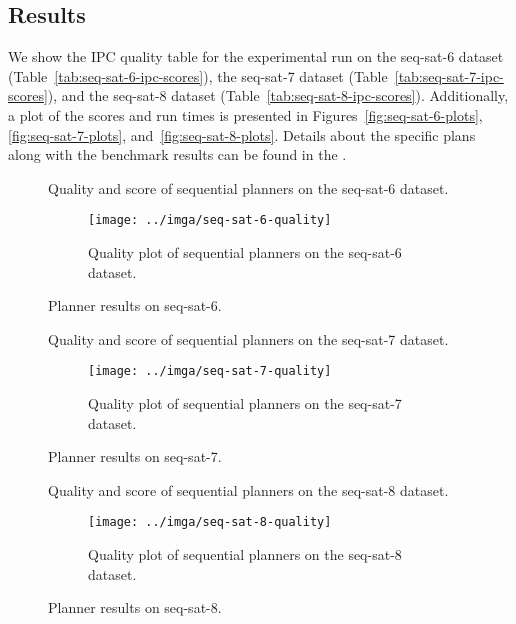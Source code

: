 \subsection{Results}\label{sequential-results}

We show the IPC quality table
for the experimental run on the seq-sat-6 dataset (Table~\ref{tab:seq-sat-6-ipc-scores}),
the seq-sat-7 dataset (Table~\ref{tab:seq-sat-7-ipc-scores}),
and the seq-sat-8 dataset (Table~\ref{tab:seq-sat-8-ipc-scores}).
Additionally, a plot of the scores and run times is presented in Figures~\ref{fig:seq-sat-6-plots},
\ref{fig:seq-sat-7-plots}, and~\ref{fig:seq-sat-8-plots}. Details about the specific plans along with the benchmark results can be found in the .

\begin{figure}
\centering
\begin{subtable}{\textwidth}
\centering

\caption{Quality and score of sequential planners on the seq-sat-6 dataset.}
\label{tab:seq-sat-6-ipc-scores}
\end{subtable}
\quad
\begin{subfigure}{\textwidth}
\centering
\texttt{[image: ../imga/seq-sat-6-quality]}
\caption{Quality plot of sequential planners on the seq-sat-6 dataset.}
\label{fig:seq-sat-6-quality}
\end{subfigure}
\caption{Planner results on seq-sat-6.}
\label{fig:seq-sat-6-results}
\end{figure}

\begin{figure}
\centering
\begin{subtable}{\textwidth}
\centering

\caption{Quality and score of sequential planners on the seq-sat-7 dataset.}
\label{tab:seq-sat-7-ipc-scores}
\end{subtable}
\quad
\begin{subfigure}{\textwidth}
\centering
\texttt{[image: ../imga/seq-sat-7-quality]}
\caption{Quality plot of sequential planners on the seq-sat-7 dataset.}
\label{fig:seq-sat-7-quality}
\end{subfigure}
\caption{Planner results on seq-sat-7.}
\label{fig:seq-sat-7-results}
\end{figure}

\begin{figure}
\centering
\begin{subtable}{\textwidth}
\centering

\caption{Quality and score of sequential planners on the seq-sat-8 dataset.}
\label{tab:seq-sat-8-ipc-scores}
\end{subtable}
\quad
\begin{subfigure}{\textwidth}
\centering
\texttt{[image: ../imga/seq-sat-8-quality]}
\caption{Quality plot of sequential planners on the seq-sat-8 dataset.}
\label{fig:seq-sat-8-quality}
\end{subfigure}
\caption{Planner results on seq-sat-8.}
\label{fig:seq-sat-8-results}
\end{figure}

